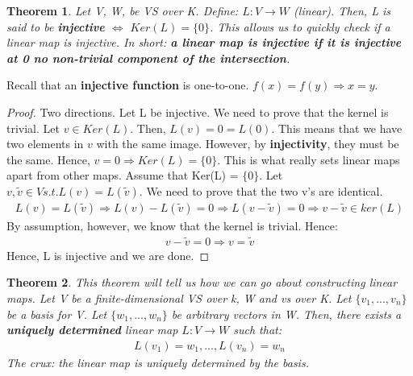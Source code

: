 \documentclass[a4paper, 12pt]{article}
\newtheorem{theorem}{Theorem}
\theoremstyle{definition}
\theoremstyle{definition}
\theoremstyle{definition}
\theoremstyle{definition}
\begin{document}
{\begin{theorem}
	Let V, W, be VS over K. Define: $L: V \rightarrow W$ (linear). Then, L is said to be \textbf{injective} $\iff$ $Ker(L) = \{ 0 \}$. This allows us to quickly check if a linear map is injective. In short: \textbf{a linear map is injective if it is injective at 0 no non-trivial component of the intersection}. 
\end{theorem}
Recall that an \textbf{injective function} is one-to-one. $f(x) = f(y) \Rightarrow x = y$. 

\begin{proof}
	Two directions.
	\newline
	[ $\Rightarrow$ ] Let L be injective. We need to prove that the kernel is trivial. Let $v \in Ker(L)$. Then, $L(v) = 0 =L(0)$. This means that we have two elements in $v$ with the same image. However, by \textbf{injectivity}, they must be the same. Hence, $v=0 \Rightarrow Ker(L) = \{ 0 \}$.  
	\newline 
	\newline 
	[ $\Leftarrow$ ] This is what really sets linear maps apart from other maps. Assume that Ker(L) = $\{ 0 \}$. Let $v, \tilde{v} \in V s.t. L(v) = L(\tilde{v})$. We need to prove that the two v's are identical. 
	\begin{align*}
		L(v) = L(\tilde{v}) \Rightarrow L(v) - L(\tilde{v}) = 0 \Rightarrow L(v- \tilde{v}) = 0 \Rightarrow v - \tilde{v} \in ker(L) 
	\end{align*}
	By assumption, however, we know that the kernel is trivial. Hence: 
	\begin{align*}
		v-\tilde{v} = 0 \Rightarrow v = \tilde{v} 
	\end{align*}
	Hence, L is injective and we are done. 
\end{proof}
\begin{theorem}
	This theorem will tell us how we can go about constructing linear maps. Let V be a finite-dimensional VS over k, W and vs over K. Let $\{v_1,...,v_n \} $ be a basis for V. 
	\newline
	\newline
	Let $\{ w_1,...,w_n \}$ be arbitrary vectors in W. Then, there exists a \textbf{uniquely determined} linear map $L : V \rightarrow W$ such that: 
	\begin{align*}
		L(v_1) = w_1, ..., L(v_n) = w_n
	\end{align*}
	The crux: the linear map is uniquely determined by the basis. 
\end{theorem}

}
\end{document}
